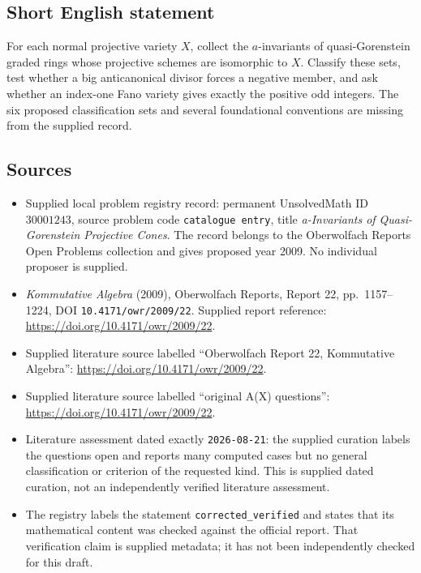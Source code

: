 \documentclass[11pt]{article}
\begin{document}
\subsection{Short English statement}
For each normal projective variety \(X\), collect the \(a\)-invariants of quasi-Gorenstein graded rings whose projective schemes are isomorphic to \(X\). Classify these sets, test whether a big anticanonical divisor forces a negative member, and ask whether an index-one Fano variety gives exactly the positive odd integers. The six proposed classification sets and several foundational conventions are missing from the supplied record.
\subsection{Sources}
\begin{itemize}
\item Supplied local problem registry record: permanent UnsolvedMath ID \(30001243\), source problem code \texttt{catalogue entry}, title \emph{a-Invariants of Quasi-Gorenstein Projective Cones}. The record belongs to the Oberwolfach Reports Open Problems collection and gives proposed year 2009. No individual proposer is supplied.
\item \emph{Kommutative Algebra} (2009), Oberwolfach Reports, Report 22, pp.~1157--1224, DOI \texttt{10.4171/owr/2009/22}. Supplied report reference: \url{https://doi.org/10.4171/owr/2009/22}.
\item Supplied literature source labelled ``Oberwolfach Report 22, Kommutative Algebra'': \url{https://doi.org/10.4171/owr/2009/22}.
\item Supplied literature source labelled ``original A(X) questions'': \url{https://doi.org/10.4171/owr/2009/22}.
\item Literature assessment dated exactly \texttt{2026-08-21}: the supplied curation labels the questions open and reports many computed cases but no general classification or criterion of the requested kind. This is supplied dated curation, not an independently verified literature assessment.
\item The registry labels the statement \texttt{corrected\_verified} and states that its mathematical content was checked against the official report. That verification claim is supplied metadata; it has not been independently checked for this draft.
\end{itemize}
\end{document}
